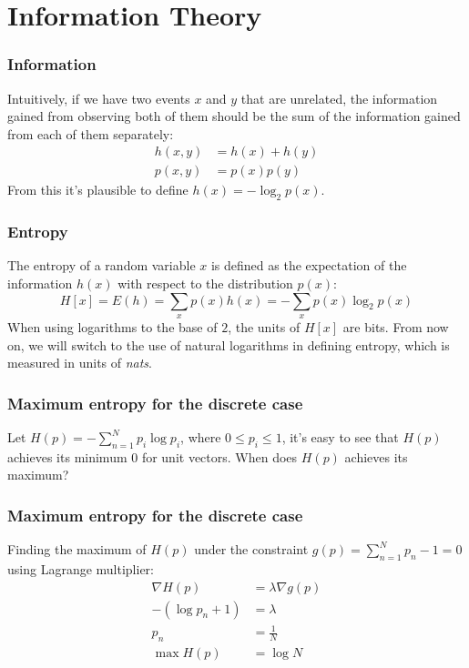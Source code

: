 \documentclass{beamer}
\begin{document}
\section{Information Theory}

\begin{frame}
    \frametitle{Information}
    Intuitively, if we have two events $x$ and $y$ that are unrelated, the information gained from observing both of them should be the sum of the information gained from each of them separately:
    \begin{align*}
        h(x,y)&=h(x)+h(y) \\
        p(x,y)&=p(x)p(y)
    \end{align*}
    From this it's plausible to define $h(x)=-\log_{2}p(x)$.
\end{frame}

\begin{frame}
    \frametitle{Entropy}
    The entropy of a random variable $x$ is defined as the expectation of the information $h(x)$ with respect to the distribution $p(x)$:
    \begin{equation*}
        H[x]=E(h)=\sum_{x}p(x)h(x)=-\sum_{x}p(x)\log_{2}p(x)
    \end{equation*}
    When using logarithms to the base of $2$, the units of $H[x]$ are bits. From now on, we will switch to the use of natural logarithms in defining entropy, which is measured in units of \emph{nats}.
\end{frame}

\begin{frame}
    \frametitle{Maximum entropy for the discrete case}
    Let $H(p)=-\sum_{n=1}^{N}p_{i}\log{}p_{i}$, where $0\le{}p_i\le{}1$, it's easy to see that $H(p)$ achieves its minimum $0$ for unit vectors. When does $H(p)$ achieves its maximum?
\end{frame}

\begin{frame}
    \frametitle{Maximum entropy for the discrete case}
    Finding the maximum of $H(p)$ under the constraint $g(p)=\sum_{n=1}^{N}p_{n}-1=0$ using Lagrange multiplier:
    \begin{align*}
        \nabla{}H(p)&=\lambda\nabla{}g(p) \\
        -(\log{}p_{n}+1)&=\lambda \\
        p_{n}&=\frac{1}{N} \\
        \max{}H(p)&=\log{}N
    \end{align*}
\end{frame}
\end{document}
